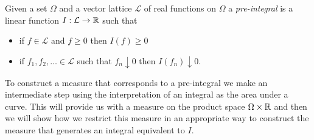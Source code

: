 \begin{defn}Given a set $\Omega$ and a vector lattice $\mathcal{L}$ of
  real functions on $\Omega$ a \emph{pre-integral} is a linear
  function $I : \mathcal{L} \to \mathbb{R}$ such that 
\begin{itemize}
\item[(i)]if $f \in \mathcal{L}$ and $f \geq 0$ then $I(f) \geq 0$
\item[(ii)]if $f_1, f_2, \dots \in \mathcal{L}$ such that $f_n
  \downarrow 0$ then $I(f_n) \downarrow 0$.
\end{itemize}
\end{defn}

To construct a measure that corresponds to a pre-integral we make an
intermediate step using the interpretation of an integral as the area
under a curve.  This will provide us with a measure on the product
space $\Omega \times \mathbb{R}$ and then we will show how we restrict
this measure in an appropriate way to construct the measure that
generates an integral equivalent to $I$.

